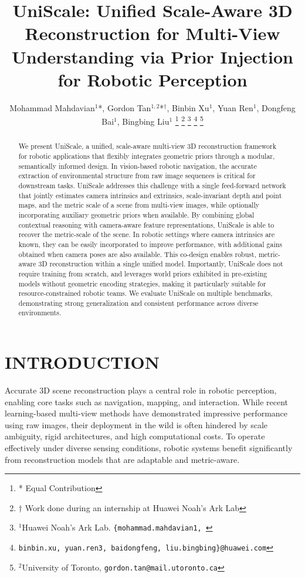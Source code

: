 \documentclass[letterpaper, 10 pt, conference]{ieeeconf}  %
\title{\LARGE \bf
UniScale: Unified Scale-Aware 3D Reconstruction for Multi-View Understanding via Prior Injection for Robotic Perception
}
\author{Mohammad Mahdavian$^{1}$*, Gordon Tan$^{1,2}$*$^{\dagger}$, Binbin Xu$^{1}$, Yuan Ren$^{1}$, Dongfeng Bai$^{1}$, Bingbing Liu$^{1}$ %
\thanks{ * Equal Contribution}%
\thanks{{$\dagger$} Work done during an internship at Huawei Noah’s Ark Lab}
\thanks{$^{1}$Huawei Noah’s Ark Lab.
         \tt\small \{mohammad.mahdavian1, } 
\thanks{\tt\small binbin.xu, yuan.ren3, baidongfeng,    liu.bingbing\}@huawei.com}
\thanks{$^{2}$University of Toronto,
        \tt\small gordon.tan@mail.utoronto.ca}%
}
\begin{document}
\maketitle
\thispagestyle{empty}
\pagestyle{empty}

\begin{abstract}

We present UniScale, a unified, scale-aware multi-view 3D reconstruction framework for robotic applications that flexibly integrates geometric priors through a modular, semantically informed design. In vision-based robotic navigation, the accurate extraction of environmental structure from raw image sequences is critical for downstream tasks. UniScale addresses this challenge with a single feed-forward network that jointly estimates camera intrinsics and extrinsics, scale-invariant depth and point maps, and the metric scale of a scene from multi-view images, while optionally incorporating auxiliary geometric priors when available.
By combining global contextual reasoning with camera-aware feature representations, UniScale is able to recover the metric-scale of the scene. In robotic settings where camera intrinsics are known, they can be easily incorporated to improve performance, with additional gains obtained when camera poses are also available. This co-design enables robust, metric-aware 3D reconstruction within a single unified model. Importantly, UniScale does not require training from scratch, and leverages world priors exhibited in pre-existing models without geometric encoding strategies, making it particularly suitable for resource-constrained robotic teams. We evaluate UniScale on multiple benchmarks, demonstrating strong generalization and consistent performance across diverse environments. 

\end{abstract}


\section{INTRODUCTION}


Accurate 3D scene reconstruction plays a central role in robotic perception, enabling core tasks such as navigation, mapping, and interaction. While recent learning-based multi-view methods have demonstrated impressive performance using raw images, their deployment in the wild is often hindered by scale ambiguity, rigid architectures, and high computational costs. To operate effectively under diverse sensing conditions, robotic systems benefit significantly from reconstruction models that are adaptable and metric-aware.
\end{document}
